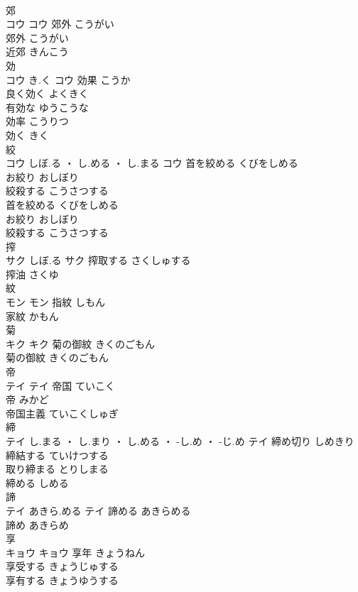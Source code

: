 \documentclass[8pt]{extreport}
\begin{document}
\begin{CJK}{UTF8}{min}
\\	郊	
\\	コウ		コウ	郊外	こうがい	
\\	郊外	こうがい	
\\	近郊	きんこう	
\\	効	
\\	コウ	き.く	コウ	効果	こうか	
\\	良く効く	よくきく	
\\	有効な	ゆうこうな	
\\	効率	こうりつ	
\\	効く	きく	
\\	絞	
\\	コウ	しぼ.る ・ し.める ・ し.まる	コウ	首を絞める	くびをしめる	
\\	お絞り	おしぼり	
\\	絞殺する	こうさつする	
\\	首を絞める	くびをしめる	
\\	お絞り	おしぼり	
\\	絞殺する	こうさつする	
\\	搾	
\\	サク	しぼ.る	サク	搾取する	さくしゅする	
\\	搾油	さくゆ	
\\	紋	
\\	モン		モン	指紋	しもん	
\\	家紋	かもん	
\\	菊	
\\	キク		キク	菊の御紋	きくのごもん	
\\	菊の御紋	きくのごもん	
\\	帝	
\\	テイ		テイ	帝国	ていこく	
\\	帝	みかど	
\\	帝国主義	ていこくしゅぎ	
\\	締	
\\	テイ	し.まる ・ し.まり ・ し.める ・ -し.め ・ -じ.め	テイ	締め切り	しめきり	
\\	締結する	ていけつする	
\\	取り締まる	とりしまる	
\\	締める	しめる	
\\	諦	
\\	テイ	あきら.める	テイ	諦める	あきらめる	
\\	諦め	あきらめ	
\\	享	
\\	キョウ		キョウ	享年	きょうねん	
\\	享受する	きょうじゅする	
\\	享有する	きょうゆうする	

\end{CJK}
\end{document}
